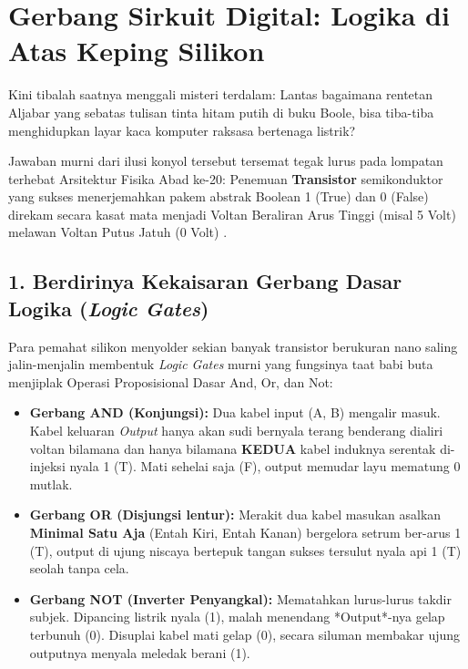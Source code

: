 \section{Gerbang Sirkuit Digital: Logika di Atas Keping Silikon}

Kini tibalah saatnya menggali misteri terdalam: Lantas bagaimana rentetan Aljabar yang sebatas tulisan tinta hitam putih di buku Boole, bisa tiba-tiba menghidupkan layar kaca komputer raksasa bertenaga listrik? 

Jawaban murni dari ilusi konyol tersebut tersemat tegak lurus pada lompatan terhebat Arsitektur Fisika Abad ke-20: Penemuan \textbf{Transistor} semikonduktor yang sukses menerjemahkan pakem abstrak Boolean 1 (True) dan 0 (False) direkam secara kasat mata menjadi Voltan Beraliran Arus Tinggi (misal 5 Volt) melawan Voltan Putus Jatuh (0 Volt) \cite{grinnell_logic,hackatronic}. 

\subsection{1. Berdirinya Kekaisaran Gerbang Dasar Logika (\textit{Logic Gates})}

Para pemahat silikon menyolder sekian banyak transistor berukuran nano saling jalin-menjalin membentuk \textit{Logic Gates} murni yang fungsinya taat babi buta menjiplak Operasi Proposisional Dasar And, Or, dan Not:

\begin{itemize}
    \item \textbf{Gerbang AND (Konjungsi):} Dua kabel input (A, B) mengalir masuk. Kabel keluaran \textit{Output} hanya akan sudi bernyala terang benderang dialiri voltan bilamana dan hanya bilamana \textbf{KEDUA} kabel induknya serentak di-injeksi nyala 1 (T). Mati sehelai saja (F), output memudar layu mematung 0 mutlak.
    \item \textbf{Gerbang OR (Disjungsi lentur):} Merakit dua kabel masukan asalkan \textbf{Minimal Satu Aja} (Entah Kiri, Entah Kanan) bergelora setrum ber-arus 1 (T), output di ujung niscaya bertepuk tangan sukses tersulut nyala api 1 (T) seolah tanpa cela.
    \item \textbf{Gerbang NOT (Inverter Penyangkal):} Mematahkan lurus-lurus takdir subjek. Dipancing listrik nyala (1), malah menendang *Output*-nya gelap terbunuh (0). Disuplai kabel mati gelap (0), secara siluman membakar ujung outputnya menyala meledak berani (1).
\end{itemize}

